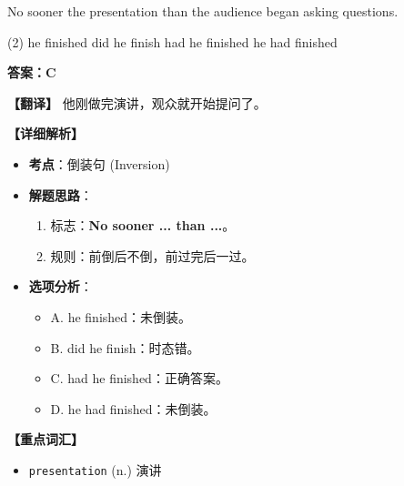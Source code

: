 \documentclass[11pt, a4paper]{article}
\newcommand{\analysis}[4]{
    \begin{solutionbox}
        \textbf{答案：#1}
        
        \textbf{【翻译】} #2
        
        \textbf{【详细解析】}
        #3
        
        \textbf{【重点词汇】}
        #4
    \end{solutionbox}
}
\newcommand{\blank}{\underline{\hspace{1.5cm}}}
\begin{document}
\begin{questions}
    \item No sooner \blank the presentation than the audience began asking questions.
    \begin{tasks}(2)
        \task he finished \task did he finish
        \task had he finished \task he had finished
    \end{tasks}
    \analysis{C}{他刚做完演讲，观众就开始提问了。}{
        \begin{itemize}
            \item \textbf{考点}：倒装句 (Inversion)
            \item \textbf{解题思路}：
                \begin{enumerate}
                    \item 标志：\textbf{No sooner ... than ...}。
                    \item 规则：前倒后不倒，前过完后一过。
                \end{enumerate}
            \item \textbf{选项分析}：
                \begin{itemize}
                    \item A. he finished：未倒装。
                    \item B. did he finish：时态错。
                    \item C. had he finished：正确答案。
                    \item D. he had finished：未倒装。
                \end{itemize}
        \end{itemize}
    }{
        \begin{itemize}
            \item \texttt{presentation} (n.) 演讲
        \end{itemize}
    }


\end{questions}
\end{document}
